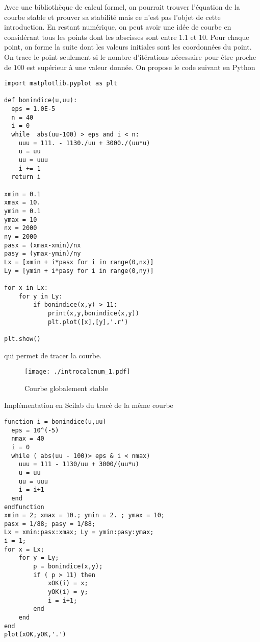 Avec une bibliothèque de calcul formel, on pourrait trouver l'équation de la courbe stable et prouver sa stabilité mais ce n'est pas l'objet de cette introduction. En restant numérique, on peut avoir une idée de courbe en considérant tous les points dont les abscisses sont entre $1.1$ et $10$. Pour chaque point, on forme la suite dont les valeurs initiales sont les coordonnées du point. On trace le point seulement si le nombre d'itérations nécessaire pour être proche de $100$ est supérieur à une valeur donnée. On propose le code suivant en Python
\begin{verbatim}
import matplotlib.pyplot as plt

def bonindice(u,uu):
  eps = 1.0E-5
  n = 40
  i = 0
  while  abs(uu-100) > eps and i < n:
    uuu = 111. - 1130./uu + 3000./(uu*u)
    u = uu
    uu = uuu
    i += 1
  return i

xmin = 0.1
xmax = 10.
ymin = 0.1
ymax = 10
nx = 2000
ny = 2000
pasx = (xmax-xmin)/nx
pasy = (ymax-ymin)/ny
Lx = [xmin + i*pasx for i in range(0,nx)]
Ly = [ymin + i*pasy for i in range(0,ny)]

for x in Lx:
    for y in Ly:
        if bonindice(x,y) > 11:
            print(x,y,bonindice(x,y))
            plt.plot([x],[y],'.r')

plt.show()  
\end{verbatim}
qui permet de tracer la courbe.
\begin{figure}[h]
  \centering
  \texttt{[image: ./introcalcnum\_1.pdf]}
  \caption{Courbe globalement stable}
  \label{fig:introcalcnum_1}
\end{figure}
Implémentation en Scilab du tracé de la même courbe
\begin{verbatim}
function i = bonindice(u,uu)
  eps = 10^(-5)
  nmax = 40
  i = 0
  while ( abs(uu - 100)> eps & i < nmax)
    uuu = 111 - 1130/uu + 3000/(uu*u)
    u = uu
    uu = uuu
    i = i+1
  end
endfunction
xmin = 2; xmax = 10.; ymin = 2. ; ymax = 10;
pasx = 1/88; pasy = 1/88;
Lx = xmin:pasx:xmax; Ly = ymin:pasy:ymax;
i = 1;
for x = Lx;
    for y = Ly;
        p = bonindice(x,y);
        if ( p > 11) then
            xOK(i) = x;
            yOK(i) = y;
            i = i+1;
        end
    end
end
plot(xOK,yOK,'.')
\end{verbatim}
